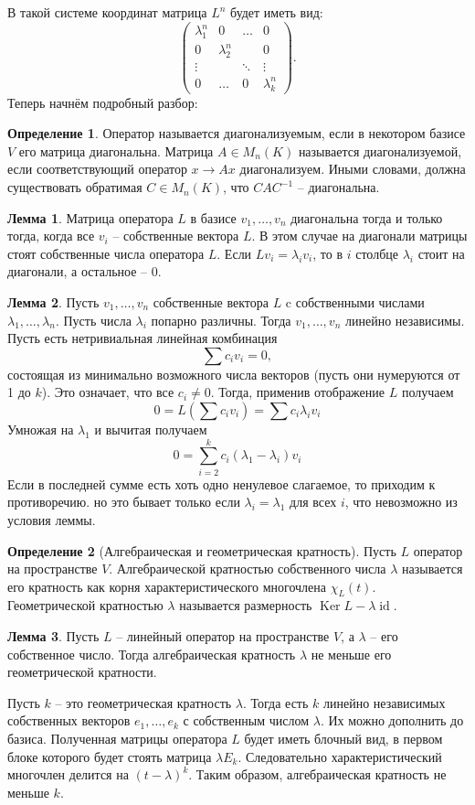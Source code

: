 \documentclass[10pt,a4paper,oneside]{book}
\theoremstyle{definition}
\newtheorem*{defn}{\color{yellow!30!red} Определение}
\newtheorem{lem}{\color{green!50!black}Лемма}
\newcommand{\id}{\operatorname{id}}
\DeclareMathOperator{\Ker}{Ker}
\def\dfn{\begin{defn}}
\def\edfn{\end{defn}}
\def\lm{\begin{lem}}
\def\elm{\end{lem}}
\def\pmat{\begin{pmatrix}}
\def\epmat{\end{pmatrix}}
\begin{document}
В такой системе координат матрица $L^n$ будет иметь вид:
$$\pmat \lambda_1^n & 0& \dots & 0\\
0 & \lambda_2^n & &0 \\
\vdots && \ddots &\vdots \\
0 & \dots & 0 & \lambda_k^n \epmat.$$
Теперь начнём подробный разбор:


\dfn Оператор называется диагонализуемым,  если в некотором базисе $V$ его матрица диагональна. Матрица $A\in M_n(K)$ называется диагонализуемой, если соответствующий оператор $x\to Ax$ диагонализуем. Иными словами, должна существовать обратимая $C\in M_n(K)$, что $CAC^{-1}$ -- диагональна. 
\edfn



\lm Матрица оператора $L$ в базисе $v_1,\dots,v_n$ диагональна тогда и только тогда, когда все $v_i$ -- собственные вектора $L$. В этом случае на диагонали матрицы стоят собственные числа оператора $L$.
\proof Если $Lv_i=\lambda_iv_i$, то в $i$ столбце $\lambda_i$ стоит на диагонали, а остальное -- $0$.
\endproof
\elm



\lm Пусть $v_1,\dots,v_n$ собственные вектора $L$ c собственными числами $\lambda_1,\dots,\lambda_n$. Пусть числа $\lambda_i$ попарно различны. Тогда $v_1,\dots,v_n$ линейно независимы.
\proof Пусть есть нетривиальная линейная комбинация $$\sum c_i v_i=0,$$
состоящая из минимально возможного числа векторов (пусть они нумеруются от 1 до $k$). Это означает, что все $c_i\neq 0$. Тогда, применив отображение $L$ получаем
$$0=L\left(\sum c_i v_i\right)= \sum c_i \lambda_i v_i$$
Умножая на $\lambda_1$ и вычитая получаем $$0=\sum_{i=2}^k c_i(\lambda_1-\lambda_i)v_i$$
Если в последней сумме есть хоть одно ненулевое слагаемое, то приходим к противоречию. но это бывает только если $\lambda_i=\lambda_1$ для всех $i$, что невозможно из условия леммы.
\endproof
\elm

\dfn[Алгебраическая и геометрическая кратность] Пусть $L$ оператор на пространстве $V$. Алгебраической кратностью собственного числа $\lambda$ называется его кратность как корня характеристического многочлена $\chi_L(t)$. Геометрической кратностью $\lambda$ называется размерность $\Ker L-\lambda \id$.
\edfn

\lm Пусть $L$ -- линейный оператор на пространстве $V$, а $\lambda$ -- его собственное число. Тогда алгебраическая кратность $\lambda$ не меньше его геометрической кратности.
\elm
\proof Пусть $k$ -- это геометрическая кратность $\lambda$. Тогда есть $k$ линейно независимых собственных векторов $e_1,\dots,e_k$ с собственным числом $\lambda$. Их можно дополнить до базиса. Полученная матрицы оператора $L$ будет иметь блочный вид, в первом блоке которого будет стоять матрица $\lambda E_{k}$. Следовательно характеристический многочлен делится на $(t-\lambda)^k$. Таким образом, алгебраическая кратность не меньше $k$.
\endproof
\end{document}
